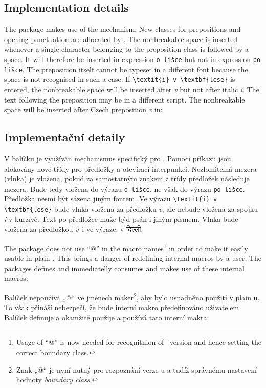 \subsection{Implementation details}
The package makes use of the  mechanism. New classes for prepositions and
opening punctuation are allocated by . The nonbreakable space is
inserted whenever a single character belonging to the preposition class is followed by a space. It
will therefore be inserted in expression \verb;o lišce; but not in expression \verb;po lišce;. The
preposition itself cannot be typeset in a different font because the space is not recognised in
such a case. If \verb;\textit{i} v \textbf{lese}; is
entered, the nonbreakable space will be inserted after \textit{v} but not after italic \textit{i}.
The text following the preposition may be in a different script. The nonbreakable space will be
inserted after Czech preposition \textit{v} in:
\else

\subsection{Implementační detaily}
V balíčku je využíván mechanismus  specifický pro \XeTeX. Pomocí příkazu 
jsou alokovány nové třídy pro předložky a otevírací interpunkci. Nezlomitelná mezera (vlnka) je
vložena, pokud za samostatným znakem z třídy předložek následuje mezera. Bude tedy vložena do
výrazu \verb;o lišce;, ne však do výrazu \verb;po lišce;. Předložka nesmí být sázena jiným fontem.
Ve výrazu \verb;\textit{i} v \textbf{lese}; bude vlnka vložena za předložku \textit{v}, ale nebude
vložena za spojku \textit{i} v kurzívě. Text po předložce může býd psán i jiným písmem. Vlnka bude
vložena za předložkou \textit{v}~i ve výraze:
\fi
v दिल्ली.

\ifeng

The package does not use “@” in the macro names\footnote{Usage of “@” is now needed for
recognitnion of \XeTeX\ version and hence setting the correct boundary class.} in order to make it easily usable in plain \XeTeX.
This brings a danger of redefining internal macros by a user. The packages defines and immediatelly
consumes  and makes use of these internal macros:

\else

Balíček nepoužívá „@“ ve jménech maker\footnote{Znak „@“ je nyní nutný pro rozpoznání verze
\XeTeX{}u a tudíž správnému nastavení hodnoty \emph{boundary class}.}, aby bylo usnadněno použití v plain \XeTeX u. To však
přináší nebezpečí, že bude interní makro předefinováno uživatelem. Balíček definuje a okamžitě
použije  a používá tato interní makra:


